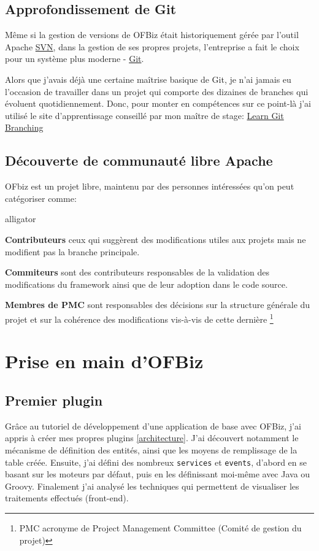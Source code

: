\subsection{Approfondissement de Git }
Même si la gestion de versions de OFBiz était historiquement gérée par l'outil Apache \href{https://subversion.apache.org/}{SVN}, dans la gestion de ses propres projets, l'entreprise a fait le choix pour un système plus moderne - \href{https://git-scm.com/}{Git}. 

Alors que j'avais déjà une certaine maîtrise basique de Git, je n'ai jamais eu l'occasion de travailler dans un projet qui comporte des dizaines de branches qui évoluent quotidiennement. Donc, pour monter en compétences sur ce point-là j'ai utilisé le site d'apprentissage conseillé par mon maître de stage: \href{https://learngitbranching.js.org/}{Learn Git Branching}

\subsection{Découverte de communauté libre Apache}
 OFbiz est un projet libre, maintenu par des personnes intéressées qu'on peut catégoriser comme: 
 \begin{labeling}{alligator}
 	\item [\textbf{Contributeurs}] ceux qui suggèrent des modifications utiles aux projets mais ne modifient pas la branche principale.
 	\item [\textbf{Commiteurs}] sont des contributeurs responsables de la validation des modifications du framework ainsi que de leur adoption dans le code source. 
 	\item [\textbf{Membres de PMC}] sont responsables des décisions sur la structure générale du projet et sur la cohérence des modifications vis-à-vis de cette dernière  \footnote{PMC acronyme de Project Management Committee (Comité de gestion du projet)}
 \end{labeling}
 
 





\section{Prise en main d'OFBiz}

\subsection{Premier plugin}
Grâce au tutoriel de développement d'une application de base avec OFBiz, j'ai appris à créer mes propres plugins \ref{architecture}. J'ai découvert notamment le mécanisme de définition des entités, ainsi que les moyens de remplissage de la table créée. Ensuite, j'ai défini des nombreux \verb|services| et \verb|events|, d'abord en se basant sur les moteurs par défaut, puis en les définissant moi-même avec Java ou Groovy. Finalement j'ai analysé les techniques qui permettent de visualiser les traitements effectués (front-end).  
